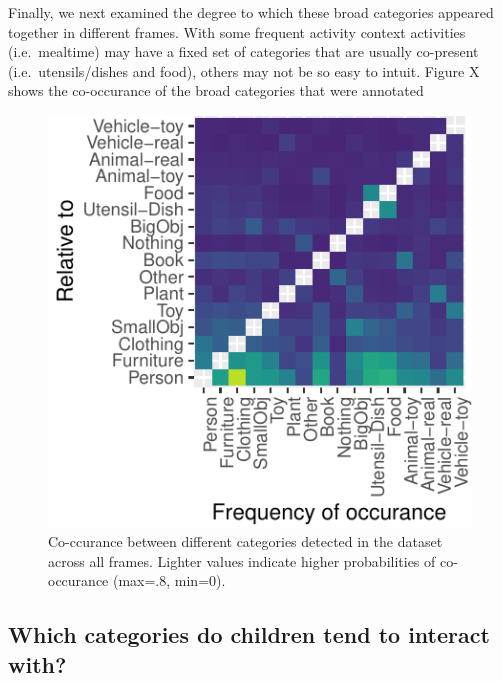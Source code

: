 \documentclass[10pt, letterpaper]{article}
\newenvironment{CodeChunk}{}{}
\begin{document}
Finally, we next examined the degree to which these broad categories
appeared together in different frames. With some frequent activity
context activities (i.e.~mealtime) may have a fixed set of categories
that are usually co-present (i.e.~utensils/dishes and food), others may
not be so easy to intuit. Figure X shows the co-occurance of the broad
categories that were annotated

\begin{CodeChunk}
\begin{figure}[h]

{\centering \includegraphics{figs/coocc_stats-1} 

}

\caption[Co-ccurance between different categories detected in the dataset across all frames]{Co-ccurance between different categories detected in the dataset across all frames. Lighter values indicate higher probabilities of co-occurance (max=.8, min=0).}\label{fig:coocc_stats}
\end{figure}
\end{CodeChunk}

\hypertarget{which-categories-do-children-tend-to-interact-with}{%
\subsection{Which categories do children tend to interact
with?}\label{which-categories-do-children-tend-to-interact-with}}
\end{document}
